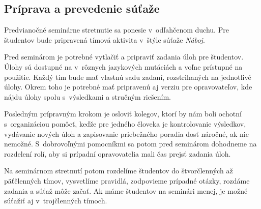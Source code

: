
\subsection*{Príprava a prevedenie súťaže}
Predvianočné seminárne stretnutie sa ponesie v~odľahčenom duchu. Pre študentov bude pripravená tímová aktivita v~štýle súťaže \textit{Náboj}.

Pred seminárom je potrebné vytlačiť a pripraviť zadania úloh pre študentov. Úlohy sú dostupné na \cite{Naboj} v~rôznych jazykových mutáciách a voľne prístupné na použitie. Každý tím bude mať vlastnú sadu zadaní, rozstrihaných na jednotlivé úlohy. Okrem toho je potrebné mať pripravenú aj verziu pre
opravovateľov, kde nájdu úlohy spolu s~výsledkami a stručným riešením.

Posledným prípravným krokom je osloviť kolegov, ktorí by nám boli ochotní s~organizáciou pomôcť, keďže pre jedného človeka je kontrolovanie výsledkov, vydávanie nových úloh a zapisovanie priebežného poradia dosť náročné, ak nie nemožné. S~dobrovoľnými pomocníkmi sa potom pred seminárom dohodneme na rozdelení rolí, aby si prípadní opravovatelia mali čas prejsť zadania úloh.

Na seminárnom stretnutí potom rozdelíme študentov do štvorčlenných až päťčlenných tímov, vysvetlíme pravidlá, zodpovieme prípadné otázky, rozdáme zadania a súťaž môže začať. Ak máme študentov na seminári menej, je možné súťažiť aj v~trojčlenných tímoch.

